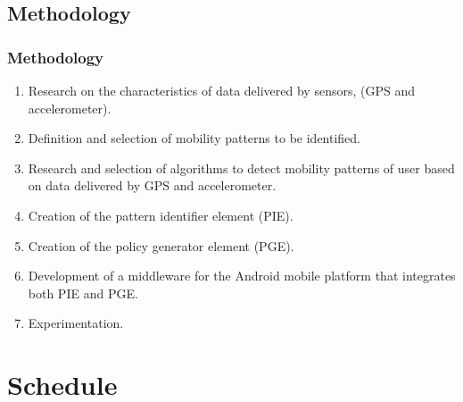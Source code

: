 \documentclass[compress,9pt,xcolor={dvipsnames,table}]{beamer}
\begin{document}
\subsection{Methodology}
\begin{frame}\frametitle{Methodology}
\begin{enumerate}
  \item Research on the characteristics of data delivered by sensors, (GPS and accelerometer).
  \item Definition and selection of mobility patterns to be identified.
  \item Research and selection of algorithms to detect mobility patterns of user based on data delivered by GPS and accelerometer.
  \item Creation of the pattern identifier element (PIE).
  \item Creation of the policy generator element (PGE).
  \item Development of a middleware for the Android mobile platform that integrates both PIE and PGE.
  \item Experimentation.
\end{enumerate}
\end{frame}


\section{Schedule}
\end{document}
